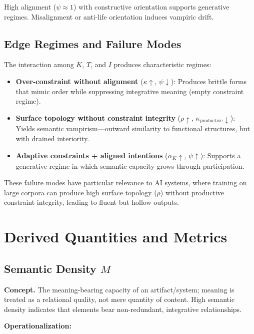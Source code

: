 \documentclass[12pt]{article}
\begin{document}
High alignment ($\psi \approx 1$) with constructive orientation supports generative regimes. Misalignment or anti-life orientation induces vampiric drift.

\subsection{Edge Regimes and Failure Modes}

The interaction among $K$, $T$, and $I$ produces characteristic regimes:

\begin{itemize}
\item \textbf{Over-constraint without alignment} ($\kappa \uparrow$, $\psi \downarrow$): Produces brittle forms that mimic order while suppressing integrative meaning (empty constraint regime).

\item \textbf{Surface topology without constraint integrity} ($\rho \uparrow$, $\kappa_{\text{productive}} \downarrow$): Yields semantic vampirism—outward similarity to functional structures, but with drained interiority.

\item \textbf{Adaptive constraints + aligned intentions} ($\alpha_K \uparrow$, $\psi \uparrow$): Supports a generative regime in which semantic capacity grows through participation.
\end{itemize}

These failure modes have particular relevance to AI systems, where training on large corpora can produce high surface topology ($\rho$) without productive constraint integrity, leading to fluent but hollow outputs.

\section{Derived Quantities and Metrics}
\label{sec:metrics}

\subsection{Semantic Density $M$}

\textbf{Concept.} The meaning-bearing capacity of an artifact/system; meaning is treated as a relational quality, not mere quantity of content. High semantic density indicates that elements bear non-redundant, integrative relationships.

\textbf{Operationalization:}
\end{document}
